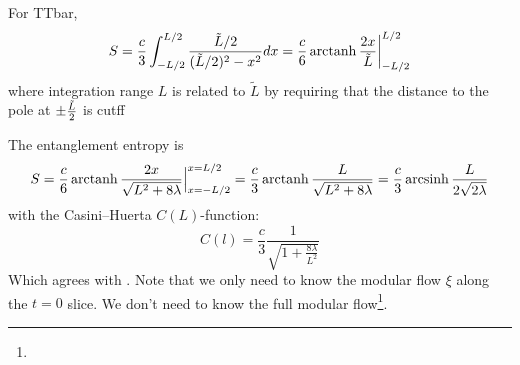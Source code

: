 \documentclass[11pt,a4paper]{article}
\begin{document}
	{\color{red} For TTbar,  \begin{equation}
	S=\frac{c}{3}\int_{- L/2}^{L/2}
		\frac{{\tilde L}/2}{({\tilde L}/2)^2-x^2}dx
		={c\over6} \operatorname{arctanh} {2x\over {\tilde L}}\bigg|^{L/2}_{-{L/2}}
	\end{equation}   }
	where integration range $L$ is related to $\tilde L$ by requiring that the distance to the pole at $\pm{\tilde L\over 2}$ is cutff
	
	
	
	The entanglement entropy is
	\begin{equation}
	S=\frac{c}{6}\operatorname{arctanh}\frac{2x}{\sqrt{L^2 + 8\lambda}}\Big|_{x=-L/2}^{x=L/2}
	=\frac{c}{3}\operatorname{arctanh}\frac{L}{\sqrt{L^2 + 8\lambda}}
	=\frac{c}{3}\operatorname{arcsinh}\frac{L}{2\sqrt{2\lambda}}
	\end{equation}
	with the Casini--Huerta $C(L)$-function:
	\begin{equation}
	C(l)=\frac{c}{3}\frac{1}{\sqrt{1+\frac{8\lambda}{L^2}}}
	\end{equation}
	Which agrees with \cite{Lewkowycz:2019xse}. 
	Note that we only need to know the modular flow $\xi$ along the $t = 0$ slice. We don't need to know the full modular flow\footnote{
	}. 
	
\end{document}
